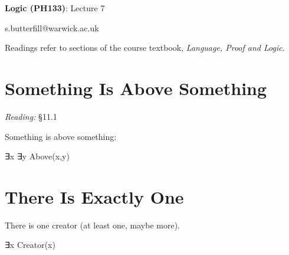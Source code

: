 \documentclass[12pt]{extarticle}
\date{}
\makeatletter
\def \ititle {Origins of Mind}
\def \isubtitle {Lecture 08}
\def \iemail{s.butterfill@warwick.ac.uk}
\makeatother
\begin{document}

\begin{multicols*}{3}

\setlength\footnotesep{1em}







\def \ititle {Logic (PH133)}
 
\def \isubtitle {Lecture 7}
 
\begin{center}
 
{\Large
 
\textbf{\ititle}: \isubtitle
 
}
 
 
 
\iemail %
 
\end{center}
 
Readings refer to sections of the course textbook, \emph{Language, Proof and Logic}.
 
 
 
 
 
 
\section{Something Is Above Something}
 
\emph{Reading:} §11.1
 
\begin{minipage}{\columnwidth}
 
Something is above something:
 
\hspace{3mm} ∃x ∃y Above(x,y)
 
\end{minipage}
 
 
 
\section{There Is Exactly One}
 
There is one creator (at least one, maybe more).
 
\hspace{3mm} ∃x Creator(x)
 

\end{multicols*}
\end{document}
